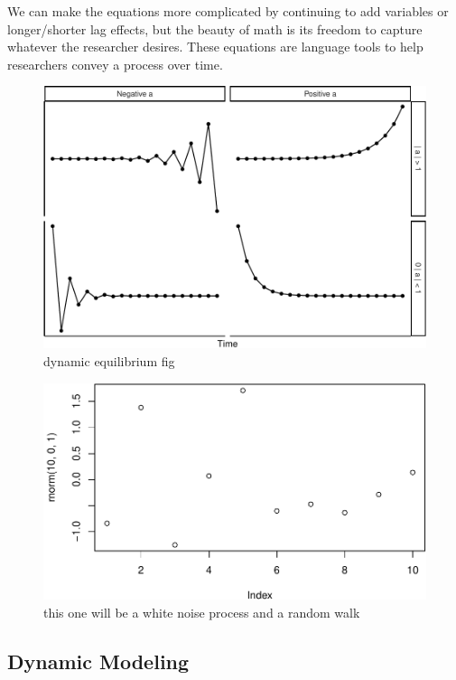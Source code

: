 \documentclass[english,,man]{apa6}
\theoremstyle{definition}
\theoremstyle{definition}
\theoremstyle{definition}
\theoremstyle{remark}
\begin{document}
We can make the equations more complicated by continuing to add
variables or longer/shorter lag effects, but the beauty of math is its
freedom to capture whatever the researcher desires. These equations are
language tools to help researchers convey a process over time.

\begin{figure}
\centering
\includegraphics{figs/unnamed-chunk-9-1.pdf}
\caption{\label{fig:unnamed-chunk-9}dynamic equilibrium
fig\label{dynamics_plot}}
\end{figure}

\begin{figure}
\centering
\includegraphics{figs/unnamed-chunk-10-1.pdf}
\caption{\label{fig:unnamed-chunk-10}this one will be a white noise process
and a random walk\label{noise}}
\end{figure}

\hypertarget{dynamic-modeling}{%
\subsection{Dynamic Modeling}\label{dynamic-modeling}}
\end{document}
